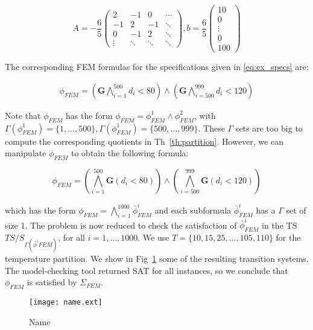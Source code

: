 \documentclass{article}
\newcommand{\Always}{\mathbf{G}}
\begin{document}
\begin{equation}
    A = - \frac{6} {5} \begin{pmatrix}
        2 & -1  & 0 & \cdots \\ 
        -1 & 2 & -1 & \ddots \\ 
        0 & -1 & 2 & \ddots \\
        \vdots & \ddots & \ddots & \ddots 
    \end{pmatrix},
    b = \frac{6} {5}\begin{pmatrix}
        10 \\
        0 \\
        \vdots \\
        0 \\
        100
    \end{pmatrix}
\end{equation}

The corresponding FEM formulas for the specifications given in
\eqref{eq:ex_specs} are:

\begin{equation}
    \begin{aligned}
        \phi_{FEM} = (\Always \bigwedge_{i = 1}^{500} d_i < 80) \wedge (\Always
            \bigwedge_{i = 500}^{999} d_i < 120)
    \end{aligned}
\end{equation}

Note that $\phi_{FEM}$ has the form $\phi_{FEM} = \phi^1_{FEM} \wedge
\phi^2_{FEM}$, with $\Gamma(\phi^1_{FEM}) = \{1,...,500\}, \Gamma(\phi^1_{FEM})
= \{500,...,999\}$. These $\Gamma$ sets are too big to compute the corresponding
quotients in Th~\ref{th:partition}. However, we can manipulate $\phi_{FEM}$ to obtain the
following formula:

\begin{equation}
    \phi_{FEM} = (\bigwedge_{i = 1}^{500} \Always (d_i < 80)) \wedge
    (\bigwedge_{i = 500}^{999} \Always (d_i < 120))
\end{equation}

which has the form $\phi_{FEM} = \bigwedge_{i=1}^{1000} \bar{\phi}^i_{FEM}$ and
each subformula $\bar{\phi}^i_{FEM}$ has a $\Gamma$ set of size 1. The problem
is now reduced to check the satisfaction of $\bar{\phi}^i_{FEM}$ in the TS
$TS/S_{\Gamma(\bar{\phi}^i{FEM})}$, for all $i=1,...,1000$. We use $T =
\{10, 15, 25,...,105,110\}$ for the temperature partition. We show in
Fig~\ref{fig:ex_ts} some of the resulting transition systems. The model-checking
tool returned SAT for all instances, so we conclude that $\phi_{FEM}$ is
satisfied by $\Sigma_{FEM}$.

\begin{figure}
    \centering
    \texttt{[image: name.ext]}
    \caption{Name}
    \label{fig:ex_ts}
\end{figure}
\end{document}
